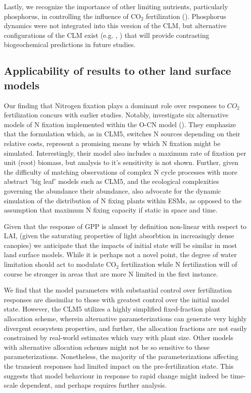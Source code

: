 \documentclass[draft,linenumbers]{agujournal}
\begin{document}
Lastly, we recognize the importance of other limiting nutrients, particularly phosphorus, in controlling the influence of CO$_{2}$ fertilization (\cite{reed2015}). Phosphorus dynamics were not integrated into this version of the CLM, but alternative configurations of the CLM exist (e.g. \cite{yang2014}, \cite{zhu2016}) that will provide contrasting biogeochemical predictions in future studies.  

\subsection{Applicability of results to other land surface models}
Our finding that Nitrogen fixation plays a dominant role over responses to $CO_{2}$ fertilization concurs with earlier studies. Notably, \cite{meyerholt2015} investigate six alternative models of N fixation implemented within the O-CN model (\cite{zaehle2010}). They emphasize that the formulation which, as in CLM5, switches N sources depending on their relative costs, represent a promising means by which N fixation might be simulated. Interestingly, their model also includes a maximum rate of fixation per unit (root) biomass, but analysis to it's sensitivity is not shown. Further, given the difficulty of matching observations of complex N cycle processes with more abstract 'big leaf' models such as CLM5, and the ecological complexities governing the abundance their abundance, \cite{meyerholt2015} also advocate for the dynamic simulation of the distribution of N fixing plants within ESMs, as opposed to the assumption that maximum N fixing capacity if static in space and time. 

Given that the response of GPP is almost by definition non-linear with respect to LAI, (given the saturating properties of light absorbtion in increasingly dense canopies) we anticipate that the impacts of initial state will be similar in most land surface models. While it is perhaps not a novel point, the degree of water limitation should act to modulate CO$_{2}$ fertilization while N fertilization will of course be stronger in areas that are more N limited in the first instance.  

We find that the model parameters with substantial control over fertilization responses are dissimilar to those with greatest control over the initial model state. However, the CLM5 utilizes a highly simplified fixed-fraction plant allocation scheme, wherein alternative parameterizations can generate very highly divergent ecosystem properties, and further, the allocation fractions are not easily constrained by real-world estimates which vary with plant size. Other models with alternative allocation schemes might not be so sensitive to these parameterizations. Nonetheless, the majority of the parameterizations affecting the transient responses had limited impact on the pre-fertilization state. This suggests that model behaviour in response to rapid change might indeed be time-scale dependent, and perhaps requires further analysis. 
\end{document}
